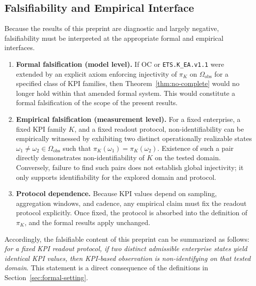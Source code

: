 \subsection{Falsifiability and Empirical Interface}

Because the results of this preprint are diagnostic and largely negative,
falsifiability must be interpreted at the appropriate formal and empirical
interfaces.

\begin{enumerate}[leftmargin=2em]
  \item \textbf{Formal falsification (model level).}
        If OC or \texttt{ETS.K\_EA.v1.1} were extended by an explicit axiom
        enforcing injectivity of \(\pi_K\) on \(\Omega_{\mathrm{obs}}\) for a
        specified class of KPI families, then
        Theorem~\ref{thm:no-complete} would no longer hold within that amended
        formal system.
        This would constitute a formal falsification of the scope of the present
        results.
  \item \textbf{Empirical falsification (measurement level).}
        For a fixed enterprise, a fixed KPI family \(K\), and a fixed readout
        protocol, non-identifiability can be empirically witnessed by exhibiting
        two distinct operationally realizable states
        \(\omega_1\neq\omega_2\in\Omega_{\mathrm{obs}}\) such that
        \(\pi_K(\omega_1)=\pi_K(\omega_2)\).
        Existence of such a pair directly demonstrates non-identifiability of
        \(K\) on the tested domain.
        Conversely, failure to find such pairs does not establish global
        injectivity; it only supports identifiability for the explored domain and
        protocol.
  \item \textbf{Protocol dependence.}
        Because KPI values depend on sampling, aggregation windows, and cadence,
        any empirical claim must fix the readout protocol explicitly.
        Once fixed, the protocol is absorbed into the definition of \(\pi_K\),
        and the formal results apply unchanged.
\end{enumerate}

Accordingly, the falsifiable content of this preprint can be summarized as
follows:
\emph{for a fixed KPI readout protocol, if two distinct admissible enterprise
states yield identical KPI values, then KPI-based observation is
non-identifying on that tested domain}.
This statement is a direct consequence of the definitions in
Section~\ref{sec:formal-setting}.
